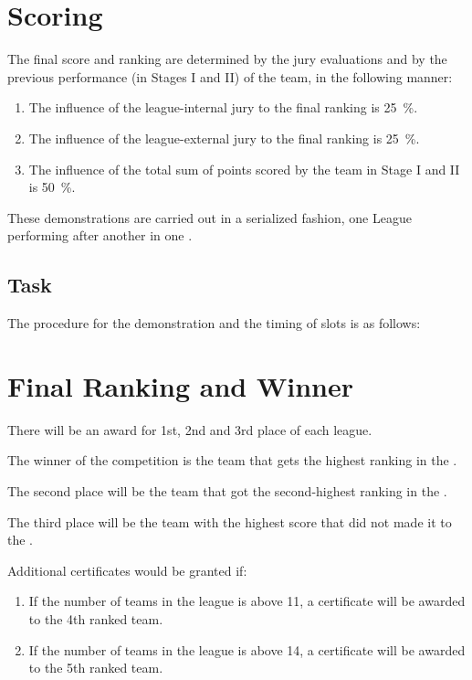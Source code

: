 \section{Scoring}
The final score and ranking are determined by the jury evaluations and by the previous performance (in Stages I and II) of the team, in the following manner:

\begin{enumerate}
  \item The influence of the league-internal jury to the final ranking is \SI{25}{\percent}.
  \item The influence of the league-external jury to the final ranking is \SI{25}{\percent}.
  \item The influence of the total sum of points scored by the team in Stage I and II is \SI{50}{\percent}.
\end{enumerate}

These demonstrations are carried out in a serialized fashion, one League performing after another in one \Arena{}.


\subsection{Task}
The procedure for the demonstration and the timing of slots is as follows:

\OpenDemonstrationChanges

\section{Final Ranking and Winner}

There will be an award for 1st, 2nd and 3rd place of each league.

The winner of the competition is the team that gets the highest ranking in the .

The second place will be the team that got the second-highest ranking in the .

The third place will be the team with the highest score that did not made it to the .

Additional certificates would be granted if:

\begin{enumerate}
  \item If the number of teams in the league is above 11, a certificate will be awarded to the 4th ranked team.
  \item If the number of teams in the league is above 14, a certificate will be awarded to the 5th ranked team.
\end{enumerate}


